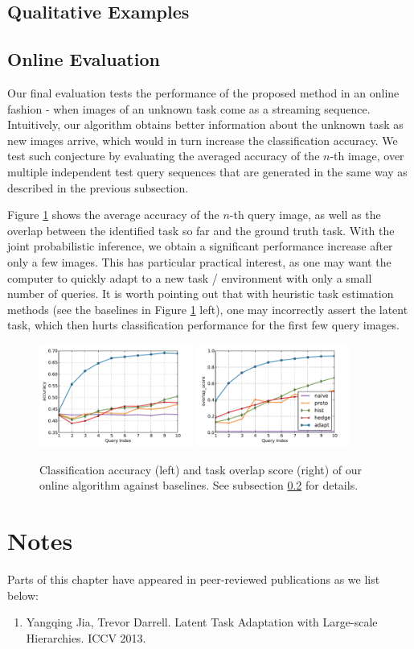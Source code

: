 \subsection{Qualitative Examples}


\subsection{Online Evaluation}\label{subsec:online}
Our final evaluation tests the performance of the proposed method in an online fashion - when images of an unknown task come as a streaming sequence. Intuitively, our algorithm obtains better information about the unknown task as new images arrive, which would in turn increase the classification accuracy. We test such conjecture by evaluating the averaged accuracy of the $n$-th image, over multiple independent test query sequences that are generated in the same way as described in the previous subsection.

Figure \ref{fig:online} shows the average accuracy of the $n$-th query image, as well as the overlap between the identified task so far and the ground truth task. With the joint probabilistic inference, we obtain a significant performance increase after only a few images. This has particular practical interest, as one may want the computer to quickly adapt to a new task / environment with only a small number of queries. It is worth pointing out that with heuristic task estimation methods (see the baselines in Figure \ref{fig:online} left), one may incorrectly assert the latent task, which then hurts classification performance for the first few query images.

\begin{figure}
    \centering
    \includegraphics[width=0.45\textwidth]{figs/taskadaptation/online_accuracy.pdf}%
    \includegraphics[width=0.45\textwidth]{figs/taskadaptation/online_overlap_score.pdf}
    \caption{Classification accuracy (left) and task overlap score (right) of our online algorithm against baselines. See subsection \ref{subsec:online} for details.}\label{fig:online}
\end{figure}

\section*{Notes}
Parts of this chapter have appeared in peer-reviewed publications as we list below:
\begin{enumerate}
\item Yangqing Jia, Trevor Darrell. Latent Task Adaptation with Large-scale Hierarchies. ICCV 2013.
\end{enumerate}